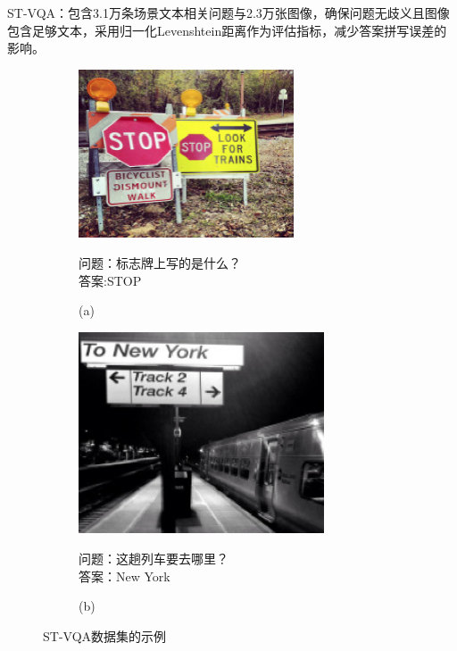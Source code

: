 \begin{enumerate}[itemsep=0pt,parsep=0pt]
​ST-VQA\cite{biten2019scene}：包含3.1万条场景文本相关问题与2.3万张图像，确保问题无歧义且图像包含足够文本，采用归一化Levenshtein距离作为评估指标，减少答案拼写误差的影响。
\begin{figure}[h]
    \begin{subfigure}[b]{0.45\textwidth}
        \centering
        \includegraphics[width=0.7\textwidth, keepaspectratio]{figures/STVQA-A.png}
        \begin{center}
            \footnotesize 问题：标志牌上写的是什么？\\
            \footnotesize 答案:STOP\\
        \end{center}
        \caption*{(a)}
    \end{subfigure}
    \hfill
    \begin{subfigure}[b]{0.45\textwidth}
        \centering
        \includegraphics[width=0.8\textwidth, keepaspectratio]{figures/STVQA-B.png}
        \begin{center}
            \footnotesize 问题：这趟列车要去哪里？\\
            \footnotesize 答案：New York\\
        \end{center}
        \caption*{(b)}
    \end{subfigure}
    \caption{ST-VQA数据集的示例}
    \centering
    \label{fig:ST-VQA-example}
\end{figure}
\end{enumerate}  

